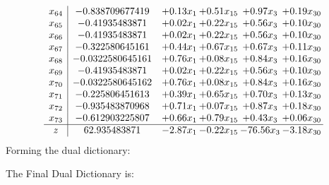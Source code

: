 \documentclass[8pt]{article}
\begin{document}
\[\begin{array}{c| c c@{\hskip 2pt} c@{\hskip 2pt} c@{\hskip 2pt} c@{\hskip 2pt} }
 x_{64}   &  -0.838709677419 & +  0.13 x_{1} & +  0.51 x_{15} & +  0.97 x_{3} & +  0.19 x_{30}\\
 x_{65}   &  -0.41935483871 & +  0.02 x_{1} & +  0.22 x_{15} & +  0.56 x_{3} & +  0.10 x_{30}\\
 x_{66}   &  -0.41935483871 & +  0.02 x_{1} & +  0.22 x_{15} & +  0.56 x_{3} & +  0.10 x_{30}\\
 x_{67}   &  -0.322580645161 & +  0.44 x_{1} & +  0.67 x_{15} & +  0.67 x_{3} & +  0.11 x_{30}\\
 x_{68}   &  -0.0322580645161 & +  0.76 x_{1} & +  0.08 x_{15} & +  0.84 x_{3} & +  0.16 x_{30}\\
 x_{69}   &  -0.41935483871 & +  0.02 x_{1} & +  0.22 x_{15} & +  0.56 x_{3} & +  0.10 x_{30}\\
 x_{70}   &  -0.0322580645162 & +  0.76 x_{1} & +  0.08 x_{15} & +  0.84 x_{3} & +  0.16 x_{30}\\
 x_{71}   &  -0.225806451613 & +  0.39 x_{1} & +  0.65 x_{15} & +  0.70 x_{3} & +  0.13 x_{30}\\
 x_{72}   &  -0.935483870968 & +  0.71 x_{1} & +  0.07 x_{15} & +  0.87 x_{3} & +  0.18 x_{30}\\
 x_{73}   &  -0.612903225807 & +  0.66 x_{1} & +  0.79 x_{15} & +  0.43 x_{3} & +  0.06 x_{30}\\
\hline
z    &  62.935483871 & -2.87 x_{1} & -0.22 x_{15} & -76.56 x_{3} & -3.18 x_{30}\\
\end{array}\]
Forming the dual dictionary:

The Final Dual Dictionary is: 
\end{document}
